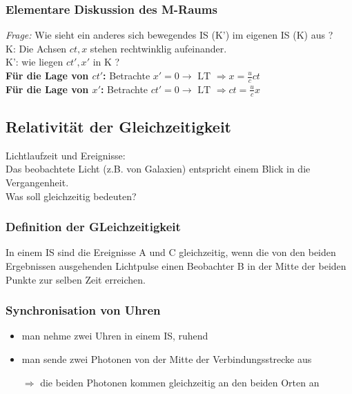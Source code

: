 \documentclass[titlepage,11pt,a4paper,ngerman]{report}
\newcommand{\tx}[1]{\textrm{#1}}
\begin{document}
\subsubsection{Elementare Diskussion des M-Raums}
\emph{Frage:} Wie sieht ein anderes sich bewegendes IS (K') im eigenen IS (K) aus ?\\[5pt]
K: Die Achsen $ ct, x $ stehen rechtwinklig aufeinander.\\
K': wie liegen $ ct', x' $ in K ?\\[5pt]
\textbf{Für die Lage von $ ct' $:}
Betrachte $ x' = 0 \rightarrow \tx{ LT } \Rightarrow x = \frac{u}{c} ct $\\
\textbf{Für die Lage von $ x' $:}
Betrachte $ ct' = 0 \rightarrow \tx{ LT } \Rightarrow ct = \frac{u}{c}x $

\subsection{Relativität der Gleichzeitigkeit}
Lichtlaufzeit und Ereignisse:\\
Das beobachtete Licht (z.B. von Galaxien) entspricht einem Blick in die Vergangenheit.\\
Was soll gleichzeitig bedeuten?

\subsubsection{Definition der GLeichzeitigkeit}
In einem IS sind die Ereignisse A und C gleichzeitig, wenn die von den beiden Ergebnissen ausgehenden Lichtpulse einen Beobachter B in der Mitte der beiden Punkte zur selben Zeit erreichen.

\subsubsection{Synchronisation von Uhren}
\begin{itemize}
	\item man nehme zwei Uhren in einem IS, ruhend
	\item man sende zwei Photonen von der Mitte der Verbindungsstrecke aus
	\item[$ \Rightarrow $] die beiden Photonen kommen gleichzeitig an den beiden Orten an
\end{itemize}
\end{document}
